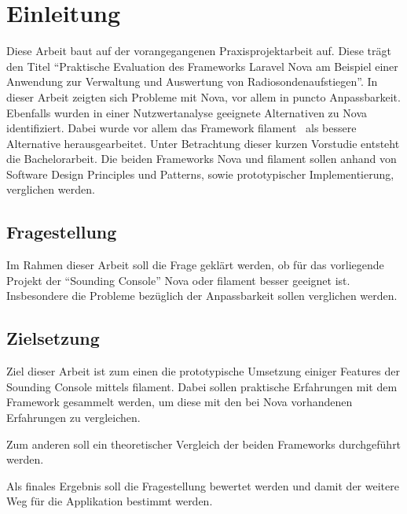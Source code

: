 \section{Einleitung}

Diese Arbeit baut auf der vorangegangenen Praxisprojektarbeit auf.
Diese trägt den Titel \enquote{Praktische Evaluation des Frameworks Laravel Nova am Beispiel einer Anwendung zur Verwaltung und Auswertung von Radiosondenaufstiegen}.
In dieser Arbeit zeigten sich Probleme mit Nova, vor allem in puncto Anpassbarkeit.
Ebenfalls wurden in einer Nutzwertanalyse geeignete Alternativen zu Nova identifiziert.
Dabei wurde vor allem das Framework filament~\cite{filament} als bessere Alternative herausgearbeitet.
Unter Betrachtung dieser kurzen Vorstudie entsteht die Bachelorarbeit.
Die beiden Frameworks Nova und filament sollen anhand von Software Design Principles und Patterns, sowie prototypischer Implementierung, verglichen werden.

\subsection{Fragestellung}
Im Rahmen dieser Arbeit soll die Frage geklärt werden, ob für das vorliegende Projekt der \enquote{Sounding Console} Nova oder filament besser geeignet ist.
Insbesondere die Probleme bezüglich der Anpassbarkeit sollen verglichen werden.

\subsection{Zielsetzung}
Ziel dieser Arbeit ist zum einen die prototypische Umsetzung einiger Features der Sounding Console mittels filament.
Dabei sollen praktische Erfahrungen mit dem Framework gesammelt werden, um diese mit den bei Nova vorhandenen Erfahrungen zu vergleichen.

Zum anderen soll ein theoretischer Vergleich der beiden Frameworks durchgeführt werden.

Als finales Ergebnis soll die Fragestellung bewertet werden und damit der weitere Weg für die Applikation bestimmt werden.
